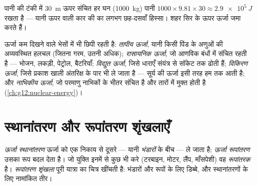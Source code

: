 \begin{example}[पानी की टंकी]\label{ex:g10:energy-conservation:potential}
पानी की टंकी में \qty{30}{m} ऊपर संचित हर घन  (\qty{1000}{kg}) पानी
$1000 \times 9.81 \times 30 \approx \qty{2.9e5}{J}$ रखता है --- यानी ऊपर वाली कार की  का लगभग
छह-दसवाँ हिस्सा। शहर सिर के ऊपर ऊर्जा जमा करते हैं।
\end{example}

\begin{definition}[बाक़ी रूप]\label{def:g10:energy-conservation:forms}
ऊर्जा कम दिखने वाले भेसों में भी छिपी रहती है: \emph{तापीय
ऊर्जा}, यानी किसी पिंड के अणुओं की अव्यवस्थित
हलचल (जितना गरम, उतनी अधिक); \emph{रासायनिक ऊर्जा}, जो आणविक बंधों में संचित रहती है --- भोजन, लकड़ी, पेट्रोल,
बैटरियाँ; \emph{विद्युत ऊर्जा}, जिसे धाराएँ संयंत्र
से सॉकेट तक ढोती हैं; \emph{विकिरण ऊर्जा}, जिसे
प्रकाश खाली अंतरिक्ष के पार भी ले जाता है --- सूर्य की ऊर्जा
इसी तरह हम तक आती है; और \emph{नाभिकीय ऊर्जा}, जो
परमाणु नाभिकों के भीतर संचित है और तारों में मुक्त होती है (\cref{ch:g12:nuclear-energy})।
\end{definition}

\section{स्थानांतरण और रूपांतरण शृंखलाएँ}

\begin{definition}\label{def:g10:energy-conservation:transfer}
\emph{ऊर्जा स्थानांतरण} ऊर्जा को एक
निकाय से दूसरे --- यानी \emph{भंडारों} के बीच ---
ले जाता है; \emph{ऊर्जा रूपांतरण} उसका रूप बदल
देता है। जो युक्ति इनमें से कुछ भी करे (टरबाइन, मोटर, लैंप, माँसपेशी) वह
\emph{रूपांतरक} है। \emph{रूपांतरण
शृंखला} पूरी यात्रा का चित्र खींचती है: भंडारों
और रूपों के लिए डिब्बे, और स्थानांतरणों के लिए नामांकित तीर।
\end{definition}


